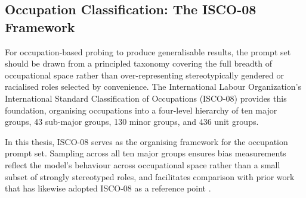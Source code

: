 \subsection{Occupation Classification: The ISCO-08 Framework}
\label{subsubsec:isco}

For occupation-based probing to produce generalisable results, the prompt set should be drawn from a principled taxonomy covering the full breadth of occupational space rather than over-representing stereotypically gendered or racialised roles selected by convenience. The International Labour Organization's International Standard Classification of Occupations (ISCO-08) \cite{ILO_ISCO08} provides this foundation, organising occupations into a four-level hierarchy of ten major groups, 43 sub-major groups, 130 minor groups, and 436 unit groups.

In this thesis, ISCO-08 serves as the organising framework for the occupation prompt set. Sampling across all ten major groups ensures bias measurements reflect the model's behaviour across occupational space rather than a small subset of strongly stereotyped roles, and facilitates comparison with prior work that has likewise adopted ISCO-08 as a reference point \cite{Naik_2023_SocialBiasesThroughTheTextToImageGenerationLens}.

